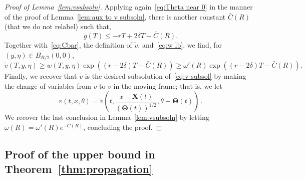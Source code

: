 \documentclass[AHL,Unicode,longabstracts]{cedram}
\newcommand{\bX}{\mathbf{X}}
\newcommand{\bTheta}{\boldsymbol{\Theta}}
\newcommand{\1}{\mathds{1}}
\begin{document}
\begin{proof}[Proof of Lemma~\ref{lem:vsubsoln}]
Applying again~\eqref{eq:Theta near 0} in the manner of the proof of Lemma~\ref{lem:aux to v subsoln}, there is another constant $\bar{C}(R)$ (that we do not relabel) such that,
\[
g(T) \leq -r T +2\delta T +\bar{C}(R).
\]
Together with~\eqref{eq:Cbar}, the definition of $\widetilde{v}$, and~\eqref{eq:w lb}, we find, for $(y,\eta)\in B_{R/2}(0,0)$,
\[
\widetilde{v}(T, y, \eta)\geq w(T, y, \eta) \exp\left ((r - 2\delta)T - \bar C(R) \right) \geq \omega'(R) \exp\left ((r - 2\delta)T - \bar C(R) \right).
\]
Finally, we recover that $v$ is the desired subsolution of~\eqref{eq:v-subsol} by making the change of variables from $\widetilde{v}$ to $v$ in the moving frame; that is, we let
\begin{equation*}
v(t,x,\theta) = \widetilde{v}\left (t, \dfrac{x - \bX(t)}{(\bTheta(t))^{1/2}}, \theta - \bTheta(t) \right)\,.
\end{equation*}
We recover the last conclusion in Lemma~\ref{lem:vsubsoln} by letting $\omega(R) = \omega'(R) e^{-\bar C(R)}$, concluding the proof.
\end{proof}



\subsection{Proof of the upper bound in Theorem~\ref{thm:propagation}}
\end{document}
